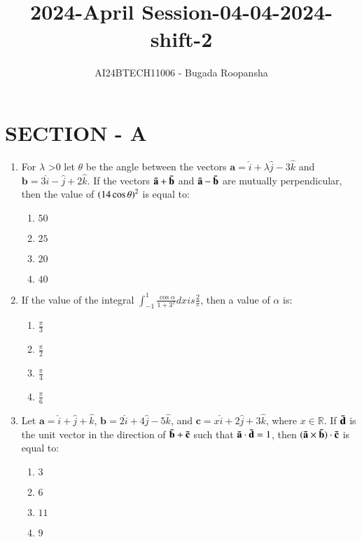 \documentclass[journal,12pt,twocolumn]{IEEEtran}
\theoremstyle{remark}
\begin{document}

\vspace{3cm}
\title{2024-April Session-04-04-2024-shift-2}
\author{AI24BTECH11006 - Bugada Roopansha}
\maketitle
\section{SECTION - A}
\begin{enumerate}[start=16]
\item For $\lambda$ \textgreater $ 0$ let $\theta$ be the angle between the vectors $\mathbf{a} = \hat{i} + \lambda \hat{j} - 3 \hat{k}$ and $\mathbf{b} = 3 \hat{i} - \hat{j} + 2 \hat{k}$. If the vectors $\mathbf{\Bar{a}} + \mathbf{\Bar{b}}$ and $\mathbf{\Bar{a}} - \mathbf{\Bar{b}}$ are mutually perpendicular, then the value of $\left(14 \cos \theta\right)^2$ is equal to:
    \begin{enumerate}
        \item $50$
        \item $25$
        \item $20$
        \item $40$
    \end{enumerate}

    \item If the value of the integral $\int_{-1}^{1} \frac{\cos \alpha}{1 + 3^x}dx is \frac{2}{\pi}$, then a value of $\alpha$ is:
    \begin{enumerate}
        \item $\frac{\pi}{3}$
        \item $\frac{\pi}{2}$
        \item $\frac{\pi}{4}$
        \item $\frac{\pi}{6}$
    \end{enumerate}

    \item Let $\mathbf{a} = \hat{i} + \hat{j} + \hat{k}$, $\mathbf{b} = 2 \hat{i} + 4 \hat{j} - 5 \hat{k}$, and $\mathbf{c} = x \hat{i} + 2 \hat{j} + 3 \hat{k}$, where $x \in \mathbb{R}$. If $\mathbf{\Bar{d}}$ is the unit vector in the direction of $\mathbf{\Bar{b}} + \mathbf{\Bar{c}}$ such that $\mathbf{\Bar{a}} \cdot \mathbf{\Bar{d}} = 1$, then $(\mathbf{\Bar{a}} \times \mathbf{\Bar{b}}) \cdot \mathbf{\Bar{c}}$ is equal to:
    \begin{enumerate}
        \item $3$
        \item $6$
        \item $11$
        \item $9$
    \end{enumerate}


\end{enumerate}
\end{document}
